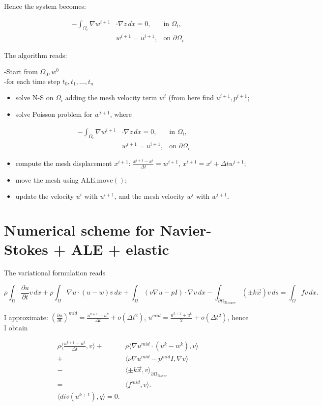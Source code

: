 \documentclass[11pt,a4paper,titlepage]{report}
\begin{document}
Hence the system becomes:

\[
\begin{aligned}
-  \int_{\Omega_i} \nabla w^{i+1} & \cdot \nabla z \, dx = 0, & \text{in } \Omega_i, \\
& w^{i+1} = u^{i+1}, & \text{on } \partial \Omega_i
\end{aligned}
\]

The algorithm reads:

-Start from $\Omega_0, w^0$ \\
-for each time step $t_0, t_1, ..., t_n$
\begin{itemize}
\item solve N-S on $\Omega_i$ adding the mesh velocity term $w^i$ (from here find $u^{i+1}, p^{i+1}$;
\item solve Poisson problem for $w^{i+1}$, where

\[
\begin{aligned}
-  \int_{\Omega_i} \nabla w^{i+1} & \cdot \nabla z \, dx = 0, & \text{in } \Omega_i, \\
& w^{i+1} = u^{i+1}, & \text{on } \partial \Omega_i
\end{aligned}
\]

\item compute the mesh displacement $x^{i+1}$: $\frac{x^{i+1} - x^{i}}{\Delta t} = w^{i+1}$, $x^{i+1} = x^{i} + \Delta t w^{i+1}$;
\item move the mesh using $\mathrm{ALE.move()}$;
\item update the velocity $u^i$ with $u^{i+1}$, and the mesh velocity $w^i$ with $w^{i+1}$.

\end{itemize}

\section{Numerical scheme for Navier-Stokes + ALE + elastic}
The variational formulation reads

\[
\rho \int_\Omega \frac{\partial u}{\partial t} v \, dx + \rho \int_\Omega \nabla u \cdot (u-w) v \, dx + \int_\Omega (\nu \nabla u - pI) \cdot \nabla v \, dx - \int_{\partial \Omega_{Tissure}} (\pm k \vec{x}) v \, ds = \int_\Omega f v \, dx.
\]

I approximate: $(\frac{\partial u}{\partial t})^{mid} = \frac{u^{k+1} - u^k}{\Delta t} + o(\Delta t^2)$, $u^{mid} = \frac{u^{k+1} + u^k}{2} + o(\Delta t^2)$, hence I obtain

\[
\begin{aligned}
\rho \langle \frac{u^{k+1} - u^k}{\Delta t}, v \rangle + & \rho \langle \nabla u^{mid} \cdot (u^k - w^k), v \rangle \\
																		+ & \langle \nu \nabla u^{mid} - p^{mid} I, \nabla v \rangle \\
																		- & \langle \pm k \vec{x}, v \rangle_{\partial \Omega_{Tissue}} \\
																		= & \langle f^{mid}, v \rangle . \\
\langle div(u^{k+1}), q \rangle = 0.
\end{aligned}
\]
\end{document}
